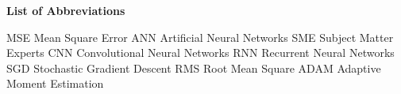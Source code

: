 \documentclass[12pt,a4paper]{article}
\begin{document}
\newpage
{}
\tableofcontents %



\newpage
\listoffigures
{}

\newpage
\listoftables
{}

\newpage
\begin{center}
  \Large\textbf{List of Abbreviations} 
  \end{center}
  \large{MSE} \indent\indent\indent\indent\indent\indent\indent\indent\indent\indent\indent\indent\large{Mean Square Error}\newline
  \large{ANN} \indent\indent\indent\indent\indent\indent\indent\indent\indent\indent\indent\indent\large{Artificial Neural Networks}\newline
  \large{SME} \indent\indent\indent\indent\indent\indent\indent\indent\indent\indent\indent\indent\large{Subject Matter Experts}\newline
  \large{CNN} \indent\indent\indent\indent\indent\indent\indent\indent\indent\indent\indent\indent\large{Convolutional Neural Networks}\newline
  \large{RNN} \indent\indent\indent\indent\indent\indent\indent\indent\indent\indent\indent\indent\large{Recurrent Neural Networks}\newline
  \large{SGD} \indent\indent\indent\indent\indent\indent\indent\indent\indent\indent\indent\indent\large{Stochastic Gradient Descent}\newline
  \large{RMS} \indent\indent\indent\indent\indent\indent\indent\indent\indent\indent\indent\indent\large{Root Mean Square}\newline
  \large{ADAM} \indent\indent\indent\indent\indent\indent\indent\indent\indent\indent\indent\large{Adaptive Moment Estimation}\newline
  
\end{document}
